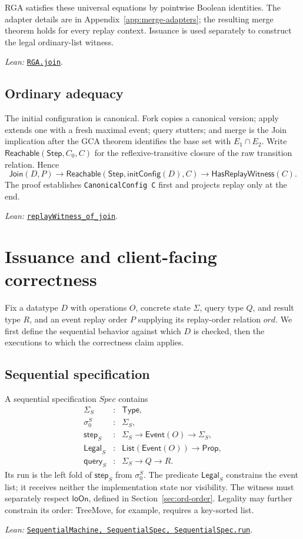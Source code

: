\documentclass[11pt]{article}
\theoremstyle{definition}
\newcommand{\State}{\Sigma}
\newcommand{\Event}{\mathsf{Event}}
\newcommand{\query}{\mathsf{query}}
\newcommand{\loOn}{\mathsf{loOn}}
\newcommand{\lean}[1]{\texttt{#1}}
\newcommand{\src}[2]{\href{../../#1}{\texttt{#2}}}
\newcommand{\anchor}[2]{\par\smallskip\noindent\emph{Lean: }\src{#1}{#2}.}
\begin{document}
RGA satisfies these universal equations by pointwise Boolean identities.
The adapter details are in Appendix~\ref{app:merge-adapters}; the resulting
merge theorem holds for every replay context. Issuance is used separately
to construct the legal ordinary-list witness.
\anchor{Sal/MRDTs/Instances/RGA.lean}{RGA.join}

\subsection{Ordinary adequacy}

The initial configuration is canonical. Fork copies a canonical version;
apply extends one with a fresh maximal event; query stutters; and merge is the
Join implication after the GCA theorem identifies the base set with
$E_1\cap E_2$. Write
$\mathsf{Reachable}(\mathsf{Step},C_0,C)$ for the reflexive-transitive closure
of the raw transition relation. Hence
\[
 \mathsf{Join}(D,P)\to
 \mathsf{Reachable}(\mathsf{Step},\mathsf{initConfig}(D),C)
 \to\mathsf{HasReplayWitness}(C).
\]
The proof establishes \lean{CanonicalConfig C} first and projects replay only
at the end.
\anchor{Sal/MRDTs/Metatheory/Adequacy.lean}{replayWitness\_of\_join}

\section{Issuance and client-facing correctness}
\label{sec:client}

Fix a datatype $D$ with operations $O$, concrete state $\State$, query type
$Q$, and result type $R$, and an event replay order $P$ supplying its replay-order
relation $ord$. We first define the sequential behavior against which $D$ is
checked, then the executions to which the correctness claim applies.

\subsection{Sequential specification}

A sequential specification $\mathit{Spec}$ contains
\[
\begin{array}{rcl}
 \State_S&:&\mathsf{Type},\\
 \sigma^S_0&:&\State_S,\\
 \mathsf{step}_S&:&\State_S\to\Event(O)\to\State_S,\\
 \mathsf{Legal}_S&:&\mathsf{List}(\Event(O))\to\mathsf{Prop},\\
 \query_S&:&\State_S\to Q\to R.
\end{array}
\]
Its run is the left fold of $\mathsf{step}_S$ from $\sigma^S_0$.
The predicate $\mathsf{Legal}_S$ constrains the event list; it receives
neither the implementation state nor visibility. The witness must separately
respect $\loOn$, defined in Section~\ref{sec:ord-order}. Legality may further
constrain its order: TreeMove, for example, requires a key-sorted list.
\anchor{Sal/MRDTs/Framework/Certificates.lean}
  {SequentialMachine, SequentialSpec, SequentialSpec.run}
\end{document}
